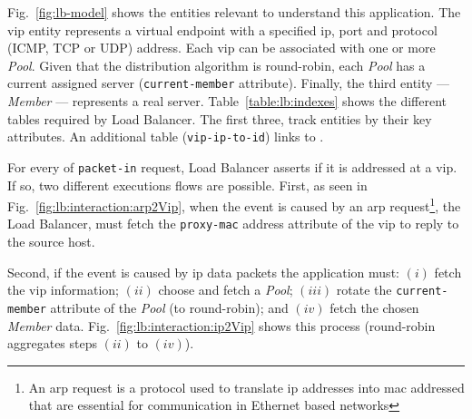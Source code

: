 Fig.~\ref{fig:lb-model} shows the entities relevant to understand this application. 
The \gls{vip} entity represents a virtual endpoint with a specified \gls{ip}, port and protocol (ICMP, TCP or UDP) address. 
Each \gls{vip} can be associated with one or more \emph{Pool}. Given that the distribution algorithm is round-robin, each \emph{Pool} has a current assigned server (\texttt{current-member} attribute). Finally, the third entity --- \emph{Member} --- represents a real server. 
Table~\ref{table:lb:indexes} shows the different tables required by  Load Balancer.
The first three, track entities by their key attributes. An additional table (\texttt{vip-ip-to-id})  links   to . 

\begin{figure}[ht]
\TopFloatBoxes
\begin{floatrow}


\end{floatrow}
\end{figure}

For every \gls{of} \texttt{packet-in} request, Load Balancer asserts if it is addressed at a \gls{vip}. If so, two different executions flows are possible. First, as seen in Fig.~\ref{fig:lb:interaction:arp2Vip}, when the event is caused by an \gls{arp} request\footnote{An \gls{arp} request is a protocol used to translate \gls{ip} addresses into \gls{mac} addressed that are essential for communication in Ethernet based networks}, the Load Balancer, must fetch the \texttt{proxy-mac} address attribute of the \gls{vip} to reply to the source host.  

Second, if the event is caused by \gls{ip} data packets the application must: $(i)$ fetch the \gls{vip} information; $(ii)$ choose and fetch a \emph{Pool}; $(iii)$ rotate the \texttt{current-member} attribute of the \emph{Pool}  (to round-robin); and $(iv)$  fetch the chosen  \emph{Member}  data. Fig.~\ref{fig:lb:interaction:ip2Vip} shows this process (round-robin aggregates steps $(ii)$ to $(iv)$).  

